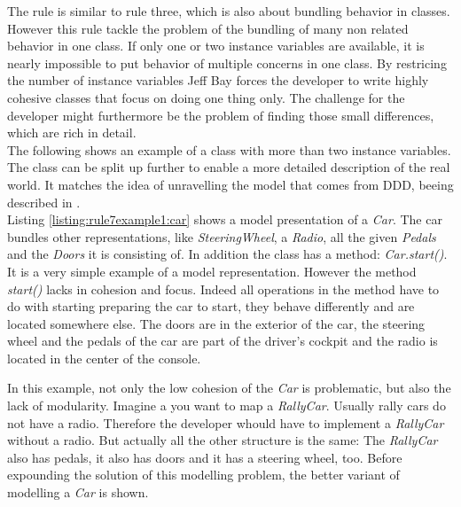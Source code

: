 The rule is similar to rule three, which is also about bundling behavior in classes. However this rule tackle the problem of the bundling of many non related behavior in one class. If only one or two instance variables are available, it is nearly impossible to put behavior of multiple concerns in one class. By restricing the number of instance variables Jeff Bay forces the developer to write highly cohesive classes that focus on doing one thing only. The challenge for the developer might furthermore be the problem of finding those small differences, which are rich in detail. 
\\

The following shows an example of a class with more than two instance variables. The class can be split up further to enable a more detailed description of the real world. It matches the idea of unravelling the model that comes from \ac{DDD}, beeing described in \cite{dddbook}.
\\

Listing \ref{listing:rule7example1:car} shows a model presentation of a \textit{Car}. The car bundles other representations, like \textit{SteeringWheel}, a \textit{Radio}, all the given \textit{Pedals} and the \textit{Doors} it is consisting of. In addition the class has a method: \textit{Car.start()}. It is a very simple example of a model representation. However the method \textit{start()} lacks in cohesion and focus. Indeed all operations in the method have to do with starting preparing the car to start, they behave differently and are located somewhere else. The doors are in the exterior of the car, the steering wheel and the pedals of the car are part of the driver's cockpit and the radio is located in the center of the console.

In this example, not only the low cohesion of the \textit{Car} is problematic, but also the lack of modularity. Imagine a you want to map a \textit{RallyCar}. Usually rally cars do not have a radio. Therefore the developer whould have to implement a \textit{RallyCar} without a radio. But actually all the other structure is the same: The \textit{RallyCar} also has pedals, it also has doors and it has a steering wheel, too. Before expounding the solution of this modelling problem, the better variant of modelling a \textit{Car} is shown. 
\\

